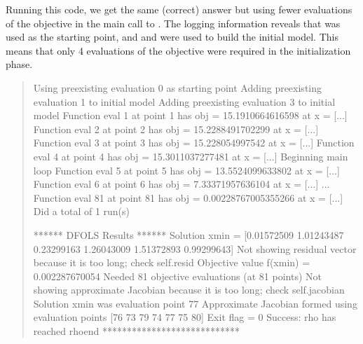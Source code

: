 \documentclass[letterpaper,10pt,english]{sphinxmanual}
\begin{document}
\begin{quote}
\begin{sphinxVerbatim}[commandchars=\\\{\}]
   

\end{sphinxVerbatim}
\end{quote}

\sphinxAtStartPar
Running this code, we get the same (correct) answer but using fewer evaluations of the objective in the main call to .
The logging information reveals that  was used as the starting point, and  and  were used to build the initial model.
This means that only 4 evaluations of the objective were required in the initialization phase.
\begin{quote}

\begin{sphinxVerbatim}[commandchars=\\\{\}]
Using pre\PYGZhy{}existing evaluation 0 as starting point
Adding pre\PYGZhy{}existing evaluation 1 to initial model
Adding pre\PYGZhy{}existing evaluation 3 to initial model
Function eval 1 at point 1 has obj = 15.1910664616598 at x = [...]
Function eval 2 at point 2 has obj = 15.2288491702299 at x = [...]
Function eval 3 at point 3 has obj = 15.228054997542 at x = [...]
Function eval 4 at point 4 has obj = 15.3011037277481 at x = [...]
Beginning main loop
Function eval 5 at point 5 has obj = 13.5524099633802 at x = [...]
Function eval 6 at point 6 has obj = 7.33371957636104 at x = [...]
...
Function eval 81 at point 81 has obj = 0.00228767005355266 at x = [...]
Did a total of 1 run(s)

****** DFO\PYGZhy{}LS Results ******
Solution xmin = [\PYGZhy{}0.01572509  1.01243487 \PYGZhy{}0.23299163  1.26043009 \PYGZhy{}1.51372893  0.99299643]
Not showing residual vector because it is too long; check self.resid
Objective value f(xmin) = 0.002287670054
Needed 81 objective evaluations (at 81 points)
Not showing approximate Jacobian because it is too long; check self.jacobian
Solution xmin was evaluation point 77
Approximate Jacobian formed using evaluation points [76 73 79 74 77 75 80]
Exit flag = 0
Success: rho has reached rhoend
****************************
\end{sphinxVerbatim}
\end{quote}
\end{document}
